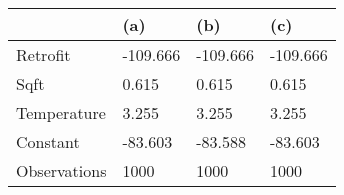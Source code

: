 \begin{tabular}{llll}
\toprule
 & (a) & (b) & (c) \\
\midrule
Retrofit & -109.666 & -109.666 & -109.666 \\
Sqft & 0.615 & 0.615 & 0.615 \\
Temperature & 3.255 & 3.255 & 3.255 \\
Constant & -83.603 & -83.588 & -83.603 \\
Observations & 1000 & 1000 & 1000 \\
\bottomrule
\end{tabular}
